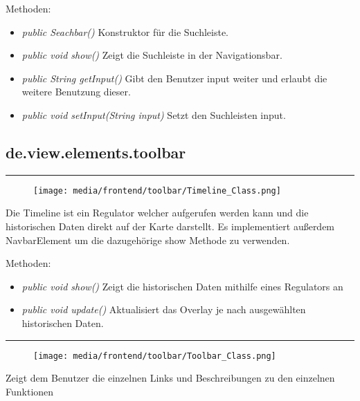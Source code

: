 Methoden:
\begin{itemize} 
    \item \emph{public Seachbar()} Konstruktor für die Suchleiste.
    \item \emph{public void show()} Zeigt die Suchleiste in der Navigationsbar.
    \item \emph{public String getInput()} Gibt den Benutzer input weiter und erlaubt die weitere Benutzung dieser.
    \item \emph{public void setInput(String input)} Setzt den Suchleisten input.
\end{itemize}

\subsection{de.view.elements.toolbar}

\rule{\textwidth}{0.4pt} 
\begin{minipage}{0.3\textwidth}
    \begin{figure}[H]
        \texttt{[image: media/frontend/toolbar/Timeline\_Class.png]}
    \end{figure}
    \end{minipage} \hfill
    \begin{minipage}{0.6\textwidth}
Die Timeline ist ein Regulator welcher aufgerufen werden kann und die historischen Daten direkt auf der Karte darstellt. Es implementiert außerdem NavbarElement um die dazugehörige show Methode zu verwenden.
\end{minipage}

Methoden:
\begin{itemize} 
    \item \emph{public void show()} Zeigt die historischen Daten mithilfe eines Regulators an 
    \item \emph{public void update()} Aktualisiert das Overlay je nach ausgewählten historischen Daten.
\end{itemize}

\rule{\textwidth}{0.4pt} 
\begin{minipage}{0.3\textwidth}
    \begin{figure}[H]
        \texttt{[image: media/frontend/toolbar/Toolbar\_Class.png]}
    \end{figure}
    \end{minipage} \hfill
    \begin{minipage}{0.6\textwidth}
Zeigt dem Benutzer die einzelnen Links und Beschreibungen zu den einzelnen Funktionen
\end{minipage}


